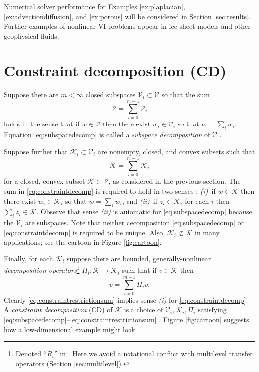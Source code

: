 \documentclass[letterpaper,final,12pt,reqno]{amsart}
\theoremstyle{cstyle}
\theoremstyle{cstyle*}
\theoremstyle{dstyle}
\numberwithin{equation}{section}
\numberwithin{figure}{section}
\numberwithin{table}{section}
\numberwithin{theorem}{section}
\newcommand{\cK}{\mathcal{K}}
\newcommand{\cV}{\mathcal{V}}
\begin{document}
Numerical solver performance for Examples \ref{ex:plaplacian}, \ref{ex:advectiondiffusion}, and \ref{ex:porous} will be considered in Section \ref{sec:results}.  Further examples of nonlinear VI problems appear in ice sheet models \cite{Calvoetal2002,JouvetBueler2012} and other geophysical fluids.


\section{Constraint decomposition (CD)} \label{sec:cd}

Suppose there are $m<\infty$ closed subspaces $\cV_i \subset \cV$ so that the sum
\begin{equation}
\cV = \sum_{i=0}^{m-1} \cV_i \label{eq:subspacedecomp}
\end{equation}
holds in the sense that if $w \in \cV$ then there exist $w_i \in \cV_i$ so that $w = \sum_i w_i$.  Equation \eqref{eq:subspacedecomp} is called a \emph{subspace decomposition} of $\cV$ \cite{Xu1992}.

Suppose further that $\cK_i \subset \cV_i$ are nonempty, closed, and convex subsets such that
\begin{equation}
\cK = \sum_{i=0}^{m-1} \cK_i \label{eq:constraintdecomp}
\end{equation}
for a closed, convex subset $\cK \subset \cV$, as considered in the previous section.  The sum in \eqref{eq:constraintdecomp} is required to hold in two senses \cite{TaiTseng2002}: \emph{(i)}~if $w \in \cK$ then there exist $w_i \in \cK_i$ so that $w = \sum_i w_i$, and \emph{(ii)}~if $z_i \in \cK_i$ for each $i$ then $\sum_i z_i \in \cK$.  Observe that sense \emph{(ii)} is automatic for \eqref{eq:subspacedecomp} because the $\cV_i$ are subspaces.  Note that neither decomposition \eqref{eq:subspacedecomp} or \eqref{eq:constraintdecomp} is required to be unique.  Also, $\cK_i \not\subset \cK$ in many applications; see the cartoon in Figure \ref{fig:cartoon}.

Finally, for each $\cK_i$ suppose there are bounded, generally-nonlinear \emph{decomposition operators}\footnote{Denoted ``$R_i$'' in \cite{Tai2003}.  Here we avoid a notational conflict with multilevel transfer operators (Section \ref{sec:multilevel}).} $\Pi_i : \cK \to \cK_i$ such that if $v \in \cK$ then
\begin{equation}
v = \sum_{i=0}^{m-1} \Pi_i v.  \label{eq:constraintrestrictionsum}
\end{equation}
Clearly \eqref{eq:constraintrestrictionsum} implies sense \emph{(i)} for \eqref{eq:constraintdecomp}. A \emph{constraint decomposition} (CD) of $\cK$ is a choice of $\cV_i,\cK_i,\Pi_i$ satisfying \eqref{eq:subspacedecomp}--\eqref{eq:constraintrestrictionsum} \cite{Tai2003}.  Figure \ref{fig:cartoon} suggests how a low-dimensional example might look.
\end{document}
